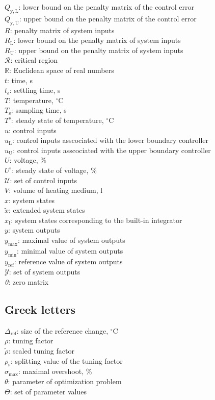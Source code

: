 \documentclass[preprint,12pt]{elsarticle}
\begin{document}
$Q_{\mathrm{y,L}}$: lower bound on the penalty matrix of the control error \\
$Q_{\mathrm{y,U}}$: upper bound on the penalty matrix of the control error \\
$R$: penalty matrix of system inputs \\
$R_{\mathrm{L}}$: lower bound on the penalty matrix of system inputs \\
$R_{\mathrm{U}}$: upper bound on the penalty matrix of system inputs \\
$\mathcal{R}$: critical region \\
$\mathbb{R}$: Euclidean space of real numbers \\
$t$: time, s \\
$t_{\epsilon}$: settling time, s \\
$T$: temperature, $^{\circ}\mathrm{C}$ \\
$T_{\mathrm{s}}$: sampling time, s \\
$T^{\mathrm{s}}$: steady state of temperature, $^{\circ}\mathrm{C}$ \\
$u$: control inputs \\
$u_{\mathrm{L}}$: control inputs asscociated with the lower boundary controller\\
$u_{\mathrm{U}}$: control inputs asscociated with the upper boundary controller\\
$U$: voltage, \% \\
$U^{\mathrm{s}}$: steady state of voltage, \% \\
$\mathcal{U}$: set of control inputs \\
$V$: volume of heating medium, l \\
$x$: system states \\
$\widetilde{x}$: extended system states \\
$x_{\mathrm{I}}$: system states corresponding to the built-in integrator \\
$y$: system outputs \\
$y_\mathrm{\max}$: maximal value of system outputs \\
$y_\mathrm{\min}$: minimal value of system outputs \\
$y_\mathrm{ref}$: reference value of system outputs \\	
$\mathcal{Y}$: set of system outputs \\
\textit{0}: zero matrix

\subsection{Greek letters}
\noindent $\Delta_\mathrm{ref}$: size of the reference change, $^{\circ}\mathrm{C}$ \\
$\rho$:	tuning factor \\
$\widetilde{\rho}$: scaled tuning factor \\
$\rho_{\mathrm{s}}$: splitting value of the tuning factor \\
$\sigma_{\max}$: maximal overshoot, \% \\
$\theta$: parameter of optimization problem \\
$\Theta$: set of parameter values
\end{document}
